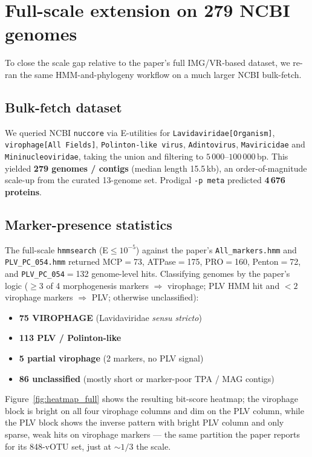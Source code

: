 \documentclass[11pt,a4paper]{article}
\begin{document}
\section{Full-scale extension on 279 NCBI genomes}
\label{sec:fullscale}

To close the scale gap relative to the paper's full IMG/VR-based dataset, we re-ran the same HMM-and-phylogeny workflow on a much larger NCBI bulk-fetch.

\subsection{Bulk-fetch dataset}
We queried NCBI \texttt{nuccore} via E-utilities for
\texttt{Lavidaviridae[Organism]}, \texttt{virophage[All Fields]}, \texttt{Polinton-like virus}, \texttt{Adintovirus}, \texttt{Maviricidae} and \texttt{Mininucleoviridae}, taking the union and filtering to $5\,000$--$100\,000$\,bp. This yielded \textbf{279 genomes / contigs} (median length 15.5\,kb), an order-of-magnitude scale-up from the curated 13-genome set. Prodigal \texttt{-p meta} predicted \textbf{4\,676 proteins}.

\subsection{Marker-presence statistics}
The full-scale \texttt{hmmsearch} (E$\le10^{-5}$) against the paper's \texttt{All\_markers.hmm} and \texttt{PLV\_PC\_054.hmm} returned
MCP$=$73, ATPase$=$175, PRO$=$160, Penton$=$72, and \texttt{PLV\_PC\_054}$=$132 genome-level hits.
Classifying genomes by the paper's logic ($\geq 3$ of 4 morphogenesis markers $\Rightarrow$ virophage; PLV HMM hit and $<2$ virophage markers $\Rightarrow$ PLV; otherwise unclassified):
\begin{itemize}[leftmargin=1.4em]
  \item \textbf{75 VIROPHAGE} (Lavidaviridae \emph{sensu stricto})
  \item \textbf{113 PLV / Polinton-like}
  \item \textbf{5 partial virophage} (2 markers, no PLV signal)
  \item \textbf{86 unclassified} (mostly short or marker-poor TPA / MAG contigs)
\end{itemize}
Figure~\ref{fig:heatmap_full} shows the resulting bit-score heatmap; the virophage block is bright on all four virophage columns and dim on the PLV column, while the PLV block shows the inverse pattern with bright PLV column and only sparse, weak hits on virophage markers --- the same partition the paper reports for its 848-vOTU set, just at $\sim\!1/3$ the scale.
\end{document}

